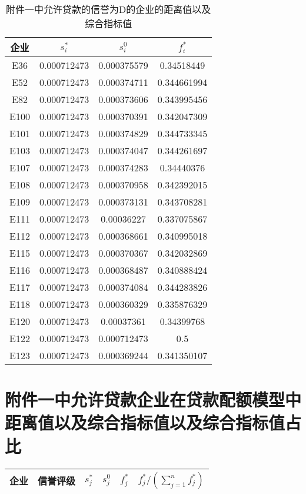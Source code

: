 \documentclass{cumcmthesis}
\begin{document}
\begin{appendices}
\begin{table}[H]   %
	\caption{附件一中允许贷款的信誉为D的企业的距离值以及综合指标值}\label{tab:013} \centering
	\begin{tabular}{cccc}
		\toprule[1.5pt]
		企业 & $s_i^*$    & $s_i^0$        & $f_i^*$         \\
		\midrule[1pt]
E36 & 0.000712473 & 0.000375579 & 0.34518449 \\ 
E52 & 0.000712473 & 0.000374711 & 0.344661994 \\ 
E82 & 0.000712473 & 0.000373606 & 0.343995456 \\ 
E100 & 0.000712473 & 0.000370391 & 0.342047309 \\ 
E101 & 0.000712473 & 0.000374829 & 0.344733345 \\ 
E103 & 0.000712473 & 0.000374047 & 0.344261697 \\ 
E107 & 0.000712473 & 0.000374283 & 0.34440376 \\ 
E108 & 0.000712473 & 0.000370958 & 0.342392015 \\ 
E109 & 0.000712473 & 0.000373131 & 0.343708281 \\ 
E111 & 0.000712473 & 0.00036227 & 0.337075867 \\ 
E112 & 0.000712473 & 0.000368661 & 0.340995018 \\ 
E115 & 0.000712473 & 0.000370367 & 0.342032869 \\ 
E116 & 0.000712473 & 0.000368487 & 0.340888424 \\ 
E117 & 0.000712473 & 0.000374084 & 0.344283826 \\ 
E118 & 0.000712473 & 0.000360329 & 0.335876329 \\ 
E120 & 0.000712473 & 0.00037361 & 0.34399768 \\ 
E122 & 0.000712473 & 0.000712473 & 0.5 \\ 
E123 & 0.000712473 & 0.000369244 & 0.341350107 \\ 
		\bottomrule[1.5pt]
	\end{tabular}
\end{table}

\section{附件一中允许贷款企业在贷款配额模型中距离值以及综合指标值以及综合指标值占比}

\begin{table}[H]   %
\centering
	\begin{tabular}{cccccc}
		\toprule[1.5pt]
       企业& 信誉评级 & $s_j^*$ & $s_j^0$ & $f_j^*$ & $f_j^*/(\sum_{j=1}^n f_j^*)$ \\ 
		\midrule[1pt]


\end{tabular}
\end{table}
\end{appendices}
\end{document}
